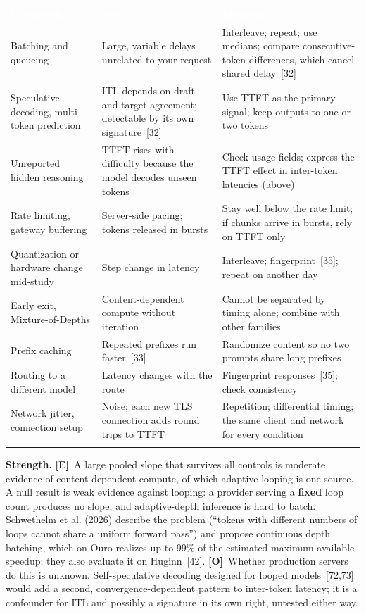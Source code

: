 \documentclass[11pt,letterpaper]{article}
\newcommand{\hd}[1]{\textcolor{white}{\bfseries #1}}
\newcommand{\tablefinish}{\arrayrulecolor{deepindigo}\specialrule{0.8pt}{0pt}{0pt}\arrayrulecolor{black}}
\newcommand{\zebra}{\rowcolors{2}{white}{paleindigo!75}}
\newcommand{\mO}{\textcolor{sensorteal}{\textbf{[O]}}}
\newcommand{\mE}{\textcolor{deepindigo}{\textbf{[E]}}}
\begin{document}
{\footnotesize
\zebra
\begin{tabularx}{\textwidth}{L{3.2cm} L{4.6cm} Y}
\hd{Confounder} & \hd{Effect} & \hd{Mitigation} \\
Batching and queueing & Large, variable delays unrelated to your request & Interleave; repeat; use medians; compare consecutive-token differences, which cancel shared delay~[32] \\
Speculative decoding, multi-token prediction & ITL depends on draft and target agreement; detectable by its own signature~[32] & Use TTFT as the primary signal; keep outputs to one or two tokens \\
Unreported hidden reasoning & TTFT rises with difficulty because the model decodes unseen tokens & Check usage fields; express the TTFT effect in inter-token latencies (above) \\
Rate limiting, gateway buffering & Server-side pacing; tokens released in bursts & Stay well below the rate limit; if chunks arrive in bursts, rely on TTFT only \\
Quantization or hardware change mid-study & Step change in latency & Interleave; fingerprint~[35]; repeat on another day \\
Early exit, Mixture-of-Depths & Content-dependent compute without iteration & Cannot be separated by timing alone; combine with other families \\
Prefix caching & Repeated prefixes run faster~[33] & Randomize content so no two prompts share long prefixes \\
Routing to a different model & Latency changes with the route & Fingerprint responses~[35]; check consistency \\
Network jitter, connection setup & Noise; each new TLS connection adds round trips to TTFT & Repetition; differential timing; the same client and network for every condition \\
\tablefinish
\end{tabularx}\par}
\medskip

\textbf{Strength.} \mE\ A large pooled slope that survives all controls is moderate evidence of content-dependent compute, of which adaptive looping is one source. A null result is weak evidence against looping: a provider serving a \textbf{fixed} loop count produces no slope, and adaptive-depth inference is hard to batch. Schwethelm et al. (2026) describe the problem (``tokens with different numbers of loops cannot share a uniform forward pass'') and propose continuous depth batching, which on Ouro realizes up to 99\% of the estimated maximum available speedup; they also evaluate it on Huginn~[42]. \mO\ Whether production servers do this is unknown. Self-speculative decoding designed for looped models~[72,73] would add a second, convergence-dependent pattern to inter-token latency; it is a confounder for ITL and possibly a signature in its own right, untested either way.
\end{document}

